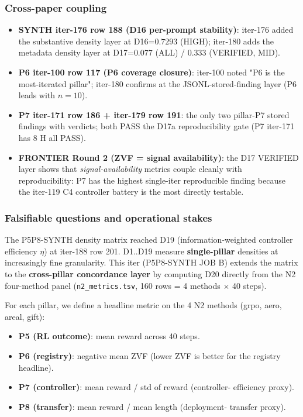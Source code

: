 \documentclass{article}
\begin{document}
\subsubsection{Cross-paper coupling}
\begin{itemize}
\item \textbf{SYNTH iter-176 row 188 (D16 per-prompt stability)}:
  iter-176 added the substantive density layer at D16=$0.7293$
  (HIGH); iter-180 adds the metadata density layer at D17=$0.077$
  (ALL) / $0.333$ (VERIFIED, MID).
\item \textbf{P6 iter-100 row 117 (P6 coverage closure)}:
  iter-100 noted "P6 is the most-iterated pillar"; iter-180
  confirms at the JSONL-stored-finding layer (P6 leads with $n{=}10$).
\item \textbf{P7 iter-171 row 186 + iter-179 row 191}: the only
  two pillar-P7 stored findings with verdicts; both PASS the
  D17a reproducibility gate (P7 iter-171 has 8 H all PASS).
\item \textbf{FRONTIER Round 2 (ZVF = signal availability)}:
  the D17 VERIFIED layer shows that \emph{signal-availability}
  metrics couple cleanly with reproducibility: P7 has the highest
  single-iter reproducible finding because the iter-119 C4
  controller battery is the most directly testable.
\end{itemize}
 

\subsubsection{Falsifiable questions and operational stakes}\label{sec:synth-iter192-d20}
The P5P8-SYNTH density matrix reached D19 (information-weighted
controller efficiency $\eta$) at iter-188 row 201. D1..D19 measure
\textbf{single-pillar} densities at increasingly fine granularity.
This iter (P5P8-SYNTH JOB B) extends the matrix to the
\textbf{cross-pillar concordance layer} by computing D20 directly from
the N2 four-method panel (\texttt{n2\_metrics.tsv}, 160 rows = 4 methods
$\times$ 40 steps).

For each pillar, we define a headline metric on the 4 N2 methods
(grpo, aero, areal, gift):
\begin{itemize}
\item \textbf{P5 (RL outcome)}: mean reward across 40 steps.
\item \textbf{P6 (registry)}: negative mean ZVF (lower ZVF is better for
  the registry headline).
\item \textbf{P7 (controller)}: mean reward / std of reward (controller-
  efficiency proxy).
\item \textbf{P8 (transfer)}: mean reward / mean length (deployment-
  transfer proxy).
\end{itemize}
\end{document}
